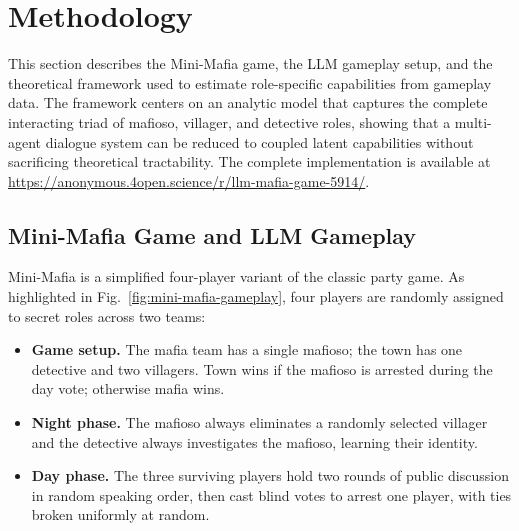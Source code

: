 \documentclass{article}
\begin{document}
\section{Methodology}
\label{sec:methodology}

This section describes the Mini-Mafia game, the LLM gameplay setup, and the theoretical framework used to estimate role-specific capabilities from gameplay data. The framework centers on an analytic model that captures the complete interacting triad of mafioso, villager, and detective roles, showing that a multi-agent dialogue system can be reduced to coupled latent capabilities without sacrificing theoretical tractability. The complete implementation is available at \url{https://anonymous.4open.science/r/llm-mafia-game-5914/}.


\subsection{Mini-Mafia Game and LLM Gameplay}
\label{sec:mini_mafia_gameplay}

Mini-Mafia is a simplified four-player variant of the classic party game. As highlighted in Fig.~\ref{fig:mini-mafia-gameplay}, four players are randomly assigned to secret roles across two teams:
\begin{itemize}
    \item \textbf{Game setup.} The mafia team has a single mafioso; the town has one detective and two villagers. Town wins if the mafioso is arrested during the day vote; otherwise mafia wins.

    \item \textbf{Night phase.} The mafioso always eliminates a randomly selected villager and the detective always investigates the mafioso, learning their identity.
    
    \item \textbf{Day phase.} The three surviving players hold two rounds of public discussion in random speaking order, then cast blind votes to arrest one player, with ties broken uniformly at random.
\end{itemize}
\end{document}
